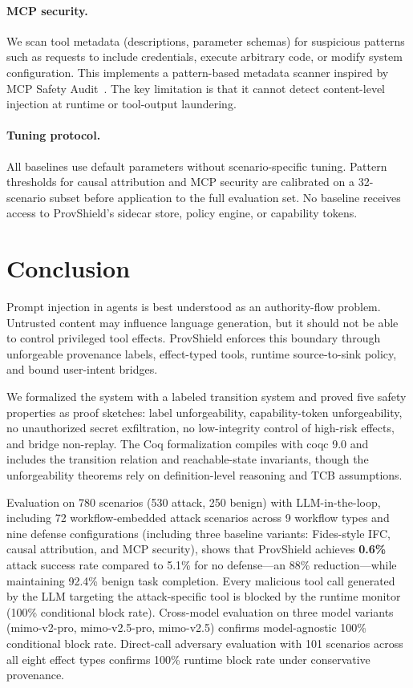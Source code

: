 \documentclass[sigconf,anonymous,review]{acmart}
\begin{document}
\paragraph{MCP security.} We scan tool metadata (descriptions, parameter schemas) for suspicious patterns such as requests to include credentials, execute arbitrary code, or modify system configuration. This implements a pattern-based metadata scanner inspired by MCP Safety Audit~\cite{mcp_safety_audit}. The key limitation is that it cannot detect content-level injection at runtime or tool-output laundering.

\paragraph{Tuning protocol.} All baselines use default parameters without scenario-specific tuning. Pattern thresholds for causal attribution and MCP security are calibrated on a 32-scenario subset before application to the full evaluation set. No baseline receives access to ProvShield's sidecar store, policy engine, or capability tokens.

\section{Conclusion}
\label{sec:conclusion}

Prompt injection in agents is best understood as an authority-flow problem. Untrusted content may influence language generation, but it should not be able to control privileged tool effects. ProvShield enforces this boundary through unforgeable provenance labels, effect-typed tools, runtime source-to-sink policy, and bound user-intent bridges.

We formalized the system with a labeled transition system and proved five safety properties as proof sketches: label unforgeability, capability-token unforgeability, no unauthorized secret exfiltration, no low-integrity control of high-risk effects, and bridge non-replay. The Coq formalization compiles with coqc 9.0 and includes the transition relation and reachable-state invariants, though the unforgeability theorems rely on definition-level reasoning and TCB assumptions.

Evaluation on 780 scenarios (530 attack, 250 benign) with LLM-in-the-loop, including 72 workflow-embedded attack scenarios across 9 workflow types and nine defense configurations (including three baseline variants: Fides-style IFC, causal attribution, and MCP security), shows that ProvShield achieves \textbf{0.6\%} attack success rate compared to 5.1\% for no defense---an 88\% reduction---while maintaining 92.4\% benign task completion. Every malicious tool call generated by the LLM targeting the attack-specific tool is blocked by the runtime monitor (100\% conditional block rate). Cross-model evaluation on three model variants (mimo-v2-pro, mimo-v2.5-pro, mimo-v2.5) confirms model-agnostic 100\% conditional block rate. Direct-call adversary evaluation with 101 scenarios across all eight effect types confirms 100\% runtime block rate under conservative provenance.
\end{document}
